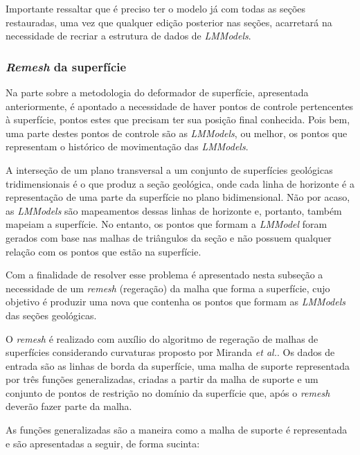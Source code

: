 Importante ressaltar que é preciso ter o modelo já com todas as seções restauradas, uma vez que qualquer edição posterior nas seções, acarretará na necessidade de recriar a estrutura de dados de \textit{LMModels}.

\subsubsection{\textit{Remesh} da superfície}

Na parte sobre a metodologia do deformador de superfície, apresentada anteriormente, é apontado a necessidade de haver pontos de controle pertencentes à superfície, pontos estes que precisam ter sua posição final conhecida. Pois bem, uma parte destes pontos de controle são as \textit{LMModels}, ou melhor, os pontos que representam o histórico de movimentação das \textit{LMModels}.

A interseção de um plano transversal a um conjunto de superfícies geológicas tridimensionais é o que produz a seção geológica, onde cada linha de horizonte é a representação de uma parte da superfície no plano bidimensional. Não por acaso, as \textit{LMModels} são mapeamentos dessas linhas de horizonte e, portanto, também mapeiam a superfície. No entanto, os pontos que formam a \textit{LMModel} foram gerados com base nas malhas de triângulos da seção e não possuem qualquer relação com os pontos que estão na superfície.

Com a finalidade de resolver esse problema é apresentado nesta subseção a necessidade de um \textit{remesh} (regeração) da malha que forma a superfície, cujo objetivo é produzir uma nova que contenha os pontos que formam as \textit{LMModels} das seções geológicas.

O \textit{remesh} é realizado com auxílio do algoritmo de regeração de malhas de superfícies considerando curvaturas proposto por Miranda \textit{et al.}\cite{Miranda}. Os dados de entrada são as linhas de borda da superfície, uma malha de suporte representada por três funções generalizadas, criadas a partir da malha de suporte e um conjunto de pontos de restrição no domínio da superfície que, após o \textit{remesh} deverão fazer parte da malha.

As funções generalizadas são a maneira como a malha de suporte é representada e são apresentadas a seguir, de forma sucinta:

